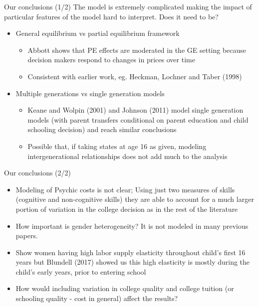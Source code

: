 \documentclass{beamer}
\begin{document}
\begin{frame}{Our conclusions (1/2)}
The model is extremely complicated making the impact of particular features of the model hard to interpret. Does it need to be?
\begin{itemize}
\item General equilibrium vs partial equilibrium framework
\begin{itemize} 
\item Abbott shows that PE effects are moderated in the GE setting because decision makers respond to changes in prices over time
\item Consistent with earlier work, eg. Heckman, Lochner and Taber (1998)
\end{itemize}
\item Multiple generations vs single generation models
\begin{itemize}
\item Keane and Wolpin (2001) and Johnson (2011) model single generation models (with parent transfers conditional on parent education and child schooling decision) and reach similar conclusions
\item Possible that, if taking states at age 16 as given, modeling intergenerational relationships does not add much to the analysis
\end{itemize}

\end{itemize}
\end{frame}

\begin{frame}{Our conclusions (2/2)}
\begin{itemize}
\item Modeling of Psychic costs is not clear; Using just two measures of skills (cognitive and non-cognitive skills) they are able to account for a much larger portion of variation in the college decision as in the rest of the literature
\item How important is gender heterogeneity? It is not modeled in many previous papers.
\item Show women having high labor supply elasticity throughout child's first 16 years but Blundell (2017) showed us this high elasticity is mostly during the child's early years, prior to entering school
\item How would including variation in college quality and college tuition (or schooling quality - cost in general) affect the results? 
\end{itemize}
\end{frame}
\end{document}
